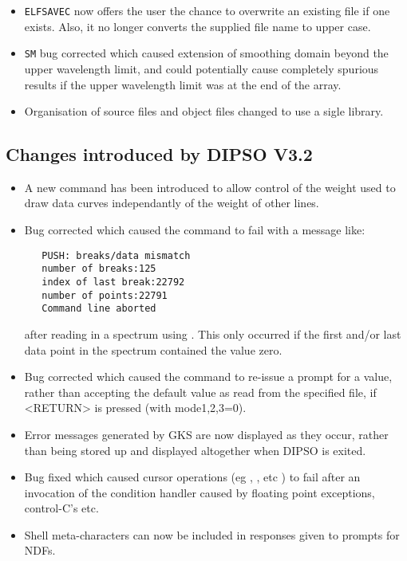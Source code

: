 \begin{itemize}
\item {\tt ELFSAVEC} now offers the user the chance to overwrite an
existing file if one exists. Also, it no longer converts the
supplied file name to upper case.

\item {\tt SM} bug corrected which caused extension of smoothing domain
beyond the upper wavelength limit, and could potentially cause
completely spurious results if the upper wavelength limit was
at the end of the array.

\item Organisation of source files and object files changed to use a
sigle library.

\end{itemize}

\subsection{Changes introduced by DIPSO V3.2}
\begin{itemize}
\item A new command   has been introduced to allow control of the
weight used to draw data curves independantly of the weight of other
lines.

\item Bug corrected which caused the   command to fail with a message
like:

\begin{verbatim}
   PUSH: breaks/data mismatch
   number of breaks:125
   index of last break:22792
   number of points:22791
   Command line aborted
\end{verbatim}

after reading in a spectrum using . This
only occurred if the first and/or last data point in the spectrum
contained the value zero.

\item Bug corrected which caused the   command to re-issue a prompt
for a value, rather than accepting the default value as read from the
specified file, if <RETURN> is pressed (with mode1,2,3=0).

\item Error messages generated by GKS are now displayed as they occur,
rather than being stored up and displayed altogether when DIPSO is
exited.

\item Bug fixed which caused cursor operations (eg ,  ,  etc ) to
fail after an invocation of the condition handler caused by floating
point exceptions, control-C's etc.

\item Shell meta-characters can now be included in responses given to
prompts for NDFs.

\end{itemize}

